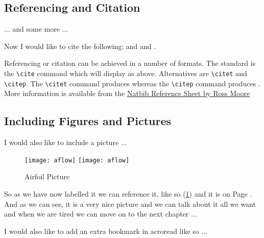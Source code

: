 \subsection{Referencing and Citation}
... and some more ...

Now I would like to cite the following: \cite{latex} and \cite{texbook}
and \cite{Rud73}.

Referencing or citation can be achieved in a number of formats.  The standard is the \verb|\cite| command which will display as above.  Alternatives are \verb|\citet| and   \verb|\citep|.  The \verb|\citet| command produces \citet{KR83} whereas the \verb|\citep| command produces \citep{latex}.  More information is available from the  \href{http://merkel.zoneo.net/Latex/natbib.php}{Natbib Reference Sheet by Ross Moore}

\subsection{Including Figures and Pictures}


I would also like to include a picture ...

\begin{figure}[!htbp]
  \begin{center}
    \leavevmode
    \ifpdf
      \texttt{[image: aflow]}
    \else
      \texttt{[image: aflow]}
    \fi
    \caption{Airfoil Picture}
    \label{FigAir}
  \end{center}
\end{figure}


So as we have now labelled it we can reference it, like so (\ref{FigAir}) and it
is on Page \pageref{FigAir}. And as we can see, it is a very nice picture and we
can talk about it all we want and when we are tired we can move on to the next
chapter ...

I would also like to add an extra bookmark in acroread like so ...
\ifpdf
\fi



